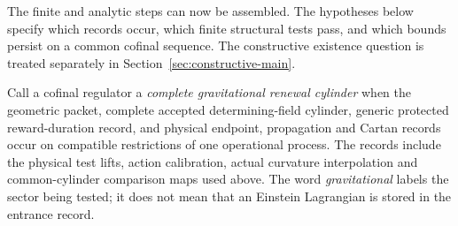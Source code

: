\documentclass[11pt]{article}
\numberwithin{equation}{section}
\theoremstyle{definition}
\theoremstyle{remark}
\begin{document}
The finite and analytic steps can now be assembled. The hypotheses below
specify which records occur, which finite structural tests pass, and which
bounds persist on a common cofinal sequence. The constructive existence
question is treated separately in Section~\ref{sec:constructive-main}.

Call a cofinal regulator a \emph{complete gravitational renewal cylinder} when
the geometric packet, complete accepted determining-field cylinder, generic
protected reward-duration record, and physical endpoint, propagation and
Cartan records occur on compatible restrictions of one operational process.
The records include the physical test lifts, action calibration, actual
curvature interpolation and common-cylinder comparison maps used above.
The word \emph{gravitational} labels the sector being tested; it does not mean
that an Einstein Lagrangian is stored in the entrance record.
\end{document}
